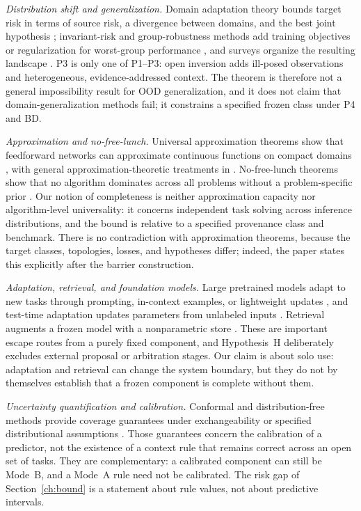 \documentclass[twoside,11pt]{article}
\begin{document}
\emph{Distribution shift and generalization.}
Domain adaptation theory bounds target risk in terms of source risk, a divergence between domains, and the best joint hypothesis \citep{bendavid2010}; invariant-risk and group-robustness methods add training objectives or regularization for worst-group performance \citep{arjovsky2019,sagawa2020}, and surveys organize the resulting landscape \citep{zhou2022,gulrajani2021,yang2024}. P3 is only one of P1--P3: open inversion adds ill-posed observations and heterogeneous, evidence-addressed context. The theorem is therefore not a general impossibility result for OOD generalization, and it does not claim that domain-generalization methods fail; it constrains a specified frozen class under P4 and BD.

\emph{Approximation and no-free-lunch.}
Universal approximation theorems show that feedforward networks can approximate continuous functions on compact domains \citep{cybenko1989,hornik1989}, with general approximation-theoretic treatments in \citet{pinkus1985}. No-free-lunch theorems show that no algorithm dominates across all problems without a problem-specific prior \citep{wolpert1996,wolpert1997,adam2019}. Our notion of completeness is neither approximation capacity nor algorithm-level universality: it concerns independent task solving across inference distributions, and the bound is relative to a specified provenance class and benchmark. There is no contradiction with approximation theorems, because the target classes, topologies, losses, and hypotheses differ; indeed, the paper states this explicitly after the barrier construction.

\emph{Adaptation, retrieval, and foundation models.}
Large pretrained models adapt to new tasks through prompting, in-context examples, or lightweight updates \citep{brown2020,bommasani2021,kaplan2020}, and test-time adaptation updates parameters from unlabeled inputs \citep{wang2021}. Retrieval augments a frozen model with a nonparametric store \citep{khandelwal2020,borgeaud2022}. These are important escape routes from a purely fixed component, and Hypothesis~H deliberately excludes external proposal or arbitration stages. Our claim is about solo use: adaptation and retrieval can change the system boundary, but they do not by themselves establish that a frozen component is complete without them.

\emph{Uncertainty quantification and calibration.}
Conformal and distribution-free methods provide coverage guarantees under exchangeability or specified distributional assumptions \citep{angelopoulos2021,romano2017}. Those guarantees concern the calibration of a predictor, not the existence of a context rule that remains correct across an open set of tasks. They are complementary: a calibrated component can still be Mode~B, and a Mode~A rule need not be calibrated. The risk gap of Section~\ref{ch:bound} is a statement about rule values, not about predictive intervals.
\end{document}
